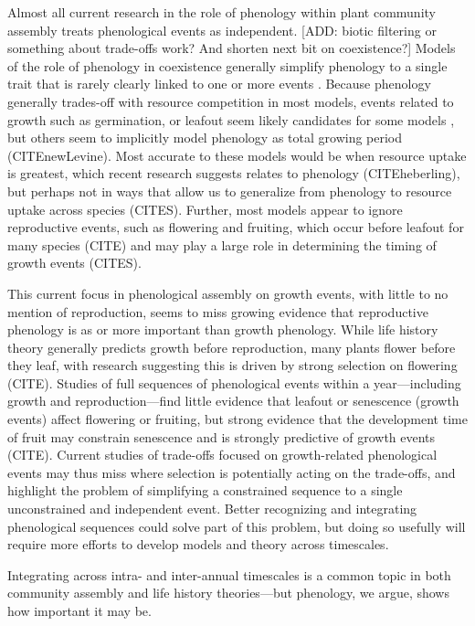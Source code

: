 \documentclass[11pt]{article}
\begin{document}
Almost all current research in the role of phenology within plant community assembly treats phenological events as independent. [ADD: biotic filtering or something about trade-offs work? And shorten next bit on coexistence?] Models of the role of phenology in coexistence generally simplify phenology to a single trait that is rarely clearly linked to one or more events \citep[even when studied with empirical data][]{godoy2014} . Because phenology generally trades-off with resource competition in most models, events related to growth such as germination, or leafout seem likely candidates for some models \citep[e.g.,][]{godoy2014,memegan2021}, but others seem to implicitly model phenology as total growing period (CITEnewLevine). Most accurate to these models would be when resource uptake is greatest, which recent research suggests relates to phenology (CITEheberling), but perhaps not in ways that allow us to generalize from phenology to resource uptake across species (CITES). Further, most models appear to ignore reproductive events, such as flowering and fruiting, which occur before leafout for many species (CITE) and may play a large role in determining the timing of growth events (CITES). 

This current focus in phenological assembly on growth events, with little to no mention of reproduction, seems to miss growing evidence that reproductive phenology is as or more important than growth phenology. While life history theory generally predicts growth before reproduction, many plants flower before they leaf, with research suggesting this is driven by strong selection on flowering (CITE). Studies of full sequences of phenological events within a year---including growth and reproduction---find little evidence that leafout or senescence (growth events) affect flowering or fruiting, but strong evidence that the development time of fruit may constrain senescence and is strongly predictive of growth events (CITE). Current studies of trade-offs focused on growth-related phenological events may thus miss where selection is potentially acting on the trade-offs, and highlight the problem of simplifying a constrained sequence to a single unconstrained and independent event. Better recognizing and integrating phenological sequences could solve part of this problem, but doing so usefully will require more efforts to develop models and theory across timescales. 

Integrating across intra- and inter-annual timescales is a common topic in both community assembly and life history theories---but phenology, we argue, shows how important it may be. 
\end{document}
